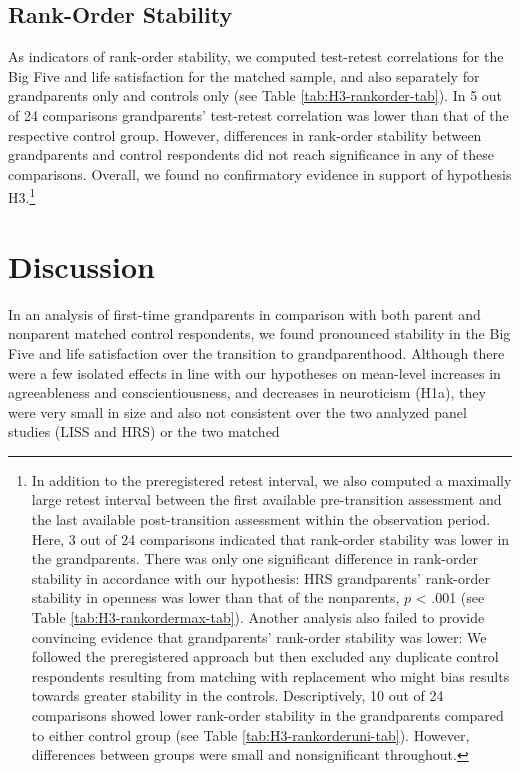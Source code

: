 \documentclass[
  english,
  man, noextraspace,floatsintext]{apa7}
\begin{document}
\hypertarget{rank-order-stability}{%
\subsection{Rank-Order Stability}\label{rank-order-stability}}

As indicators of rank-order stability, we computed test-retest correlations for the Big Five and life satisfaction for the matched sample, and also separately for grandparents only and controls only (see Table \ref{tab:H3-rankorder-tab}). In 5 out of 24 comparisons grandparents' test-retest correlation was lower than that of the respective control group. However, differences in rank-order stability between grandparents and control respondents did not reach significance in any of these comparisons. Overall, we found no confirmatory evidence in support of hypothesis H3.\footnote{In addition to the preregistered retest interval, we also computed a maximally large retest interval between the first available pre-transition assessment and the last available post-transition assessment within the observation period. Here, 3 out of 24 comparisons indicated that rank-order stability was lower in the grandparents. There was only one significant difference in rank-order stability in accordance with our hypothesis: HRS grandparents' rank-order stability in openness was lower than that of the nonparents, \(p\) \textless{} .001 (see Table \ref{tab:H3-rankordermax-tab}). Another analysis also failed to provide convincing evidence that grandparents' rank-order stability was lower: We followed the preregistered approach but then excluded any duplicate control respondents resulting from matching with replacement who might bias results towards greater stability in the controls. Descriptively, 10 out of 24 comparisons showed lower rank-order stability in the grandparents compared to either control group (see Table \ref{tab:H3-rankorderuni-tab}). However, differences between groups were small and nonsignificant throughout.}

\hypertarget{discussion}{%
\section{Discussion}\label{discussion}}

In an analysis of first-time grandparents in comparison with both parent and nonparent matched control respondents, we found pronounced stability in the Big Five and life satisfaction over the transition to grandparenthood. Although there were a few isolated effects in line with our hypotheses on mean-level increases in agreeableness and conscientiousness, and decreases in neuroticism (H1a), they were very small in size and also not consistent over the two analyzed panel studies (LISS and HRS) or the two matched
\end{document}
